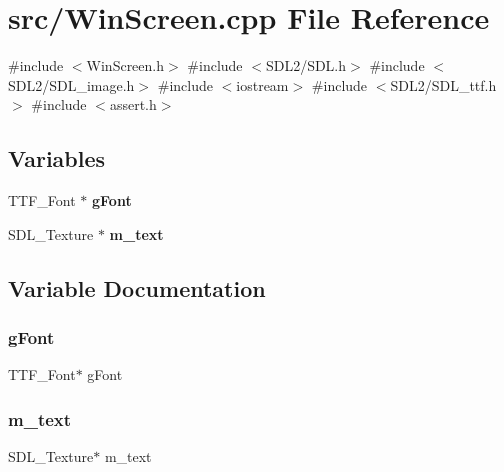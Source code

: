 \section{src/\+Win\+Screen.cpp File Reference}
\label{_win_screen_8cpp}
{\ttfamily \#include $<$Win\+Screen.\+h$>$}\newline
{\ttfamily \#include $<$S\+D\+L2/\+S\+D\+L.\+h$>$}\newline
{\ttfamily \#include $<$S\+D\+L2/\+S\+D\+L\+\_\+image.\+h$>$}\newline
{\ttfamily \#include $<$iostream$>$}\newline
{\ttfamily \#include $<$S\+D\+L2/\+S\+D\+L\+\_\+ttf.\+h$>$}\newline
{\ttfamily \#include $<$assert.\+h$>$}\newline
\subsection*{Variables}
\begin{DoxyCompactItemize}
\item 
T\+T\+F\+\_\+\+Font $\ast$ \textbf{ g\+Font}
\item 
S\+D\+L\+\_\+\+Texture $\ast$ \textbf{ m\+\_\+text}
\end{DoxyCompactItemize}


\subsection{Variable Documentation}
\mbox{\label{_win_screen_8cpp_a88e76957ec56f067af762125afcac25f}} 
\subsubsection{g\+Font}
{\footnotesize\ttfamily T\+T\+F\+\_\+\+Font$\ast$ g\+Font}

\mbox{\label{_win_screen_8cpp_a5cb0bb10e019f28cac80ee3e8ef938b8}} 
\subsubsection{m\+\_\+text}
{\footnotesize\ttfamily S\+D\+L\+\_\+\+Texture$\ast$ m\+\_\+text}

